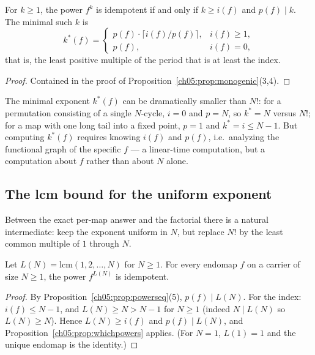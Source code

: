 \begin{proposition}
\label{ch05:prop:whichpowers}
For $k \ge 1$, the power $f^{k}$ is idempotent if and only if
$k \ge i(f)$ and $p(f) \mid k$. The minimal such $k$ is
\[
  k^{*}(f) =
  \begin{cases}
    p(f) \cdot \bigl\lceil i(f) / p(f) \bigr\rceil, & i(f) \ge 1, \\[2pt]
    p(f), & i(f) = 0,
  \end{cases}
\]
that is, the least positive multiple of the period that is at least the
index.
\end{proposition}

\begin{proof}
Contained in the proof of Proposition~\ref{ch05:prop:monogenic}(3,4).
\end{proof}

The minimal exponent $k^{*}(f)$ can be dramatically smaller than $N!$: for
a permutation consisting of a single $N$-cycle, $i = 0$ and $p = N$, so
$k^{*} = N$ versus $N!$; for a map with one long tail into a fixed point,
$p = 1$ and $k^{*} = i \le N - 1$. But computing $k^{*}(f)$ requires
knowing $i(f)$ and $p(f)$, i.e.\ analyzing the functional graph of the
specific $f$ --- a linear-time computation, but a computation about $f$
rather than about $N$ alone.

\subsection{The lcm bound for the uniform exponent}

Between the exact per-map answer and the factorial there is a natural
intermediate: keep the exponent uniform in $N$, but replace $N!$ by the
least common multiple of $1$ through $N$.

\begin{proposition}
\label{ch05:prop:lcm}
Let $L(N) = \mathrm{lcm}(1, 2, \dots, N)$ for $N \ge 1$. For every endomap
$f$ on a carrier of size $N \ge 1$, the power $f^{L(N)}$ is idempotent.
\end{proposition}

\begin{proof}
By Proposition~\ref{ch05:prop:powerseq}(5), $p(f) \mid L(N)$. For the index:
$i(f) \le N - 1$, and $L(N) \ge N > N - 1$ for $N \ge 1$ (indeed
$N \mid L(N)$ so $L(N) \ge N$). Hence $L(N) \ge i(f)$ and
$p(f) \mid L(N)$, and Proposition~\ref{ch05:prop:whichpowers} applies.
(For $N = 1$, $L(1) = 1$ and the unique endomap is the identity.)
\end{proof}

